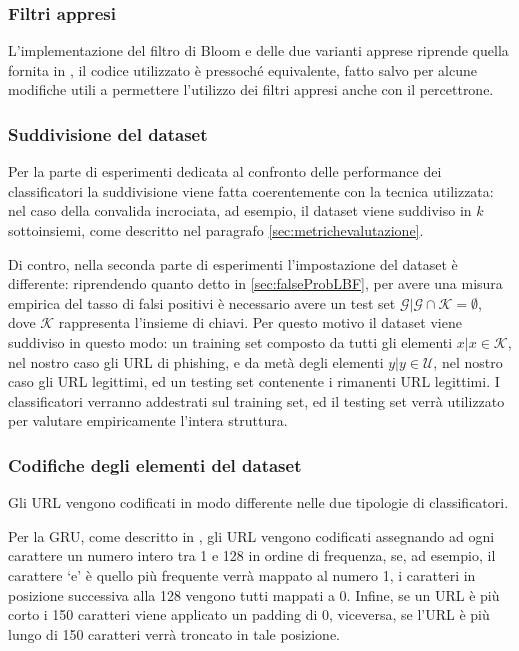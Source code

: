 \documentclass[../../main.tex]{subfiles}
\begin{document}
    \subsubsection{Filtri appresi}
    L'implementazione del filtro di Bloom e delle due varianti apprese riprende quella fornita in \cite{ma2020}, il codice utilizzato è pressoché equivalente, fatto salvo per alcune modifiche utili a permettere l'utilizzo dei filtri appresi anche con il percettrone.

    \subsubsection{Suddivisione del dataset}
    Per la parte di esperimenti dedicata al confronto delle performance dei classificatori la suddivisione viene fatta coerentemente con la tecnica utilizzata: nel caso della convalida incrociata, ad esempio, il dataset viene suddiviso in $k$ sottoinsiemi, come descritto nel paragrafo \ref{sec:metrichevalutazione}.

    Di contro, nella seconda parte di esperimenti l'impostazione del dataset è differente: riprendendo quanto detto in \ref{sec:falseProbLBF}, per avere una misura empirica del tasso di falsi positivi è necessario avere un test set $\mathcal{G} | \mathcal{G} \cap \mathcal{K} = \emptyset$, dove $\mathcal{K}$ rappresenta l'insieme di chiavi. Per questo motivo il dataset viene suddiviso in questo modo: un training set composto da tutti gli elementi $x | x \in \mathcal{K}$, nel nostro caso gli URL di phishing, e da metà degli elementi $y | y \in \mathcal{U}$, nel nostro caso gli URL legittimi, ed un testing set contenente i rimanenti URL legittimi. I classificatori verranno addestrati sul training set, ed il testing set verrà utilizzato per valutare empiricamente l'intera struttura.

    \subsubsection{Codifiche degli elementi del dataset}
    Gli URL vengono codificati in modo differente nelle due tipologie di classificatori.

    Per la GRU, come descritto in \cite{ma2020}, gli URL vengono codificati assegnando ad ogni carattere un numero intero tra 1 e 128 in ordine di frequenza, se, ad esempio, il carattere `e' è quello più frequente verrà mappato al numero 1, i caratteri in posizione successiva alla 128 vengono tutti mappati a 0. Infine, se un URL è più corto i 150 caratteri viene applicato un padding di 0, viceversa, se l'URL è più lungo di 150 caratteri verrà troncato in tale posizione.
\end{document}
